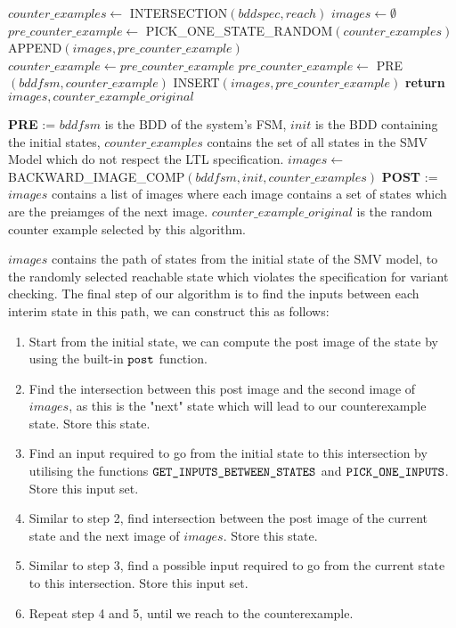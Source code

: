\begin{algorithmic}[1]
\State $counter\_examples \leftarrow$ INTERSECTION$(bddspec, reach)$
    \State $images \leftarrow \emptyset$
    \State $pre\_counter\_example \leftarrow$ PICK\_ONE\_STATE\_RANDOM$(counter\_examples)$
    \State APPEND$(images, pre\_counter\_example)$
        \State $counter\_example \leftarrow pre\_counter\_example$
        \State $pre\_counter\_example \leftarrow$ PRE$(bddfsm, counter\_example)$
        \State INSERT$(images, pre\_counter\_example)$
    \EndWhile
    \State \textbf{return }$images, counter\_example\_original$
\EndFunction
\item[]
\State \textbf{PRE} := $bddfsm$ is the BDD of the system's FSM, $init$ is the BDD containing the initial states, $counter\_examples$ contains the set of all states in the SMV Model which do not respect the LTL specification.
\State $images\leftarrow$ BACKWARD\_IMAGE\_COMP$(bddfsm, init, counter\_examples)$
\State \textbf{POST} := $images$ contains a list of images where each image contains a set of states which are the preiamges of the next image. $counter\_example\_original$ is the random counter example selected by this algorithm.
\end{algorithmic}

\medskip

$images$ contains the path of states from the initial state of the SMV model, to the randomly selected reachable state which violates the specification for variant checking. The final step of our algorithm is to find the inputs between each interim state in this path, we can construct this as follows:

\begin{enumerate}
    \item Start from the initial state, we can compute the post image of the state by using the built-in $\verb|post|$ function.
    \item Find the intersection between this post image and the second image of $images$, as this is the "next" state which will lead to our counterexample state. Store this state.
    \item Find an input required to go from the initial state to this intersection by utilising the functions $\verb|GET_INPUTS_BETWEEN_STATES|$ and $\verb|PICK_ONE_INPUTS|$. Store this input set.
    \item Similar to step 2, find intersection between the post image of the current state and the next image of $images$. Store this state.
    \item Similar to step 3, find a possible input required to go from the current state to this intersection. Store this input set.
    \item Repeat step 4 and 5, until we reach to the counterexample.
\end{enumerate}

